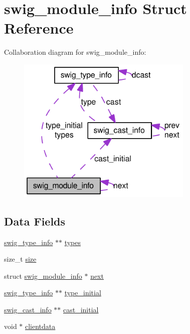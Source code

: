 \hypertarget{structswig__module__info}{
\section{swig\_\-module\_\-info Struct Reference}
\label{structswig__module__info}
}
Collaboration diagram for swig\_\-module\_\-info:\nopagebreak
\begin{figure}[H]
\begin{center}
\leavevmode
\includegraphics[width=238pt]{structswig__module__info__coll__graph}
\end{center}
\end{figure}
\subsection*{Data Fields}
\begin{CompactItemize}
\item 
\hyperlink{structswig__type__info}{swig\_\-type\_\-info} $\ast$$\ast$ \hyperlink{structswig__module__info_b3f7a3650d62b94bd66b389d74eec755}{types}
\item 
size\_\-t \hyperlink{structswig__module__info_854352f53b148adc24983a58a1866d66}{size}
\item 
struct \hyperlink{structswig__module__info}{swig\_\-module\_\-info} $\ast$ \hyperlink{structswig__module__info_f0954fbff8a3ad66e8e856a4f544a3d9}{next}
\item 
\hyperlink{structswig__type__info}{swig\_\-type\_\-info} $\ast$$\ast$ \hyperlink{structswig__module__info_54e7d318722d57d376b4d394d254228f}{type\_\-initial}
\item 
\hyperlink{structswig__cast__info}{swig\_\-cast\_\-info} $\ast$$\ast$ \hyperlink{structswig__module__info_4185798e8e6242699bc018f9183a674c}{cast\_\-initial}
\item 
void $\ast$ \hyperlink{structswig__module__info_e60177f52d83fcd32268d79f2aa8012f}{clientdata}
\end{CompactItemize}


